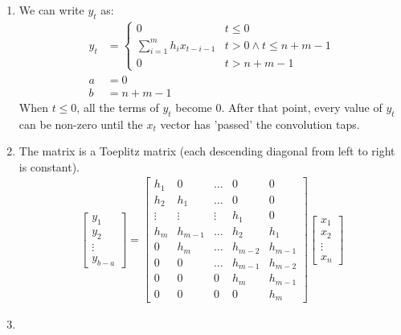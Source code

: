 \documentclass[11pt]{article}
\begin{document}
\begin{solution}
\begin{enumerate}
\item We can write $y_t$ as:
\begin{align*}
    y_t &= \begin{cases}
        0 & t \leq 0 \\
        \sum_{i=1}^{m} h_i x_{t-i-1} & t > 0 \land t \leq n + m - 1 \\
        0 & t > n + m - 1
    \end{cases} \\
    a &= 0 \\
    b &= n + m - 1
\end{align*}
When $t \leq 0$, all the terms of $y_t$ become 0. After that point, every value of $y_t$ can be non-zero until the $x_t$ vector has 'passed' the convolution taps.

\item The matrix is a Toeplitz matrix (each descending diagonal from left to right is constant).
\begin{align*}
    \begin{bmatrix}
        y_1 \\ y_2 \\ \vdots \\ y_{b-a}
    \end{bmatrix}
    =
    \begin{bmatrix}
        h_1 & 0 & \dots & 0 & 0 \\
        h_2 & h_1 & \dots & 0 & 0 \\
        \vdots & \vdots & \vdots & h_1 & 0 \\
        h_{m} & h_{m-1} & \dots & h_2 & h_1 \\
        0 & h_m & \dots & h_{m-2} & h_{m-1} \\
        0 & 0 & \dots & h_{m-1} & h_{m-2} \\
        0 & 0 & 0 & h_{m} & h_{m-1} \\
        0 & 0 & 0 & 0 & h_m
    \end{bmatrix}
    \begin{bmatrix}
        x_1 \\ x_2 \\ \vdots \\ x_n
    \end{bmatrix}
\end{align*}

\item 
\end{enumerate}
\end{solution}
\end{document}
